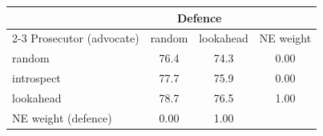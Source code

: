 \begin{tabular}{@{}lccc@{}}\toprule
 & \multicolumn{2}{c}{Defence} & \\\cmidrule(lr){2-3}
Prosecutor (advocate) & random & lookahead & NE weight\\\midrule
random & 76.4 & 74.3 & 0.00\\
introspect & 77.7 & 75.9 & 0.00\\
lookahead & 78.7 & 76.5 & 1.00\\
NE weight (defence) & 0.00 & 1.00 & \\
\bottomrule\end{tabular}
